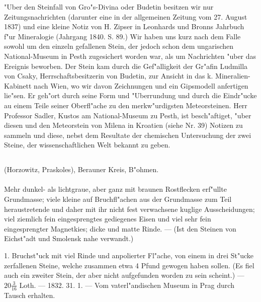 \documentclass[a4paper, 11pt, oneside, polutonikogreek, german]{article}
\begin{document}
\setlength{\leftskip}{10mm}
\setlength{\parindent}{0pt}

{\footnotesize "Uber den Steinfall von Gro"s-Divina oder Budetin besitzen wir nur Zeitungsnachrichten (darunter eine in der allgemeinen Zeitung vom 27. August 1837) und eine kleine Notiz von H. Zipser in Leonhards und Bronns Jahrbuch f"ur Mineralogie (Jahrgang 1840. S. 89.) Wir haben uns kurz nach dem Falle sowohl um den einzeln gefallenen Stein, der jedoch schon dem ungarischen National-Museum in Pesth zugesichert worden war, als um Nachrichten "uber das Ereignis beworben. Der Stein kam durch die Gef"alligkeit der Gr"afin Ludmilla von Csaky, Herrschaftsbesitzerin von Budetin, zur Ansicht in das k. Mineralien-Kabinett nach Wien, wo wir davon Zeichnungen und ein Gipsmodell anfertigen lie"sen. Er geh"ort durch seine Form und "Uberrundung und durch die Eindr"ucke au einem Teile seiner Oberfl"ache zu den merkw"urdigsten Meteorsteinen. Herr Professor Sadler, Kustos am National-Museum zu Pesth, ist besch"aftiget, "uber diesen und den Meteorstein von Milena in Kroatien (siehe Nr. 39) Notizen zu sammeln und diese, nebst dem Resultate der chemischen Untersuchung der zwei Steine, der wissenschaftlichen Welt bekannt zu geben.}

\setlength{\leftskip}{0pt}
\setlength{\parindent}{20pt}

\subsection{}
\begin{center}

(Horzowitz, Praskoles), Berauner Kreis, B"ohmen.
\end{center}
\paragraph{}
Mehr dunkel- als lichtgraue, aber ganz mit braunen Rostflecken erf"ullte Grundmasse; viele kleine auf Bruchfl"achen aus der Grundmasse zum Teil heraustretende und daher mit ihr nicht fest verwachsene kuglige Ausscheidungen; viel ziemlich fein eingesprengtes gediegenes Eisen und viel sehr fein eingesprengter Magnetkies; dicke und matte Rinde. --- (Ist den Steinen von Eichst"adt und Smolensk nahe verwandt.)

1. Bruchst"uck mit viel Rinde und anpolierter Fl"ache, von einem in drei St"ucke zerfallenen Steine, welche zusammen etwa 4 Pfund gewogen haben sollen. (Es fiel auch ein zweiter Stein, der aber nicht aufgefunden worden zu sein scheint.) --- $20\frac{3}{16}$ Loth. --- 1832. 31. 1. --- Vom vaterl"andischen Museum in Prag durch Tausch erhalten.
\end{document}
